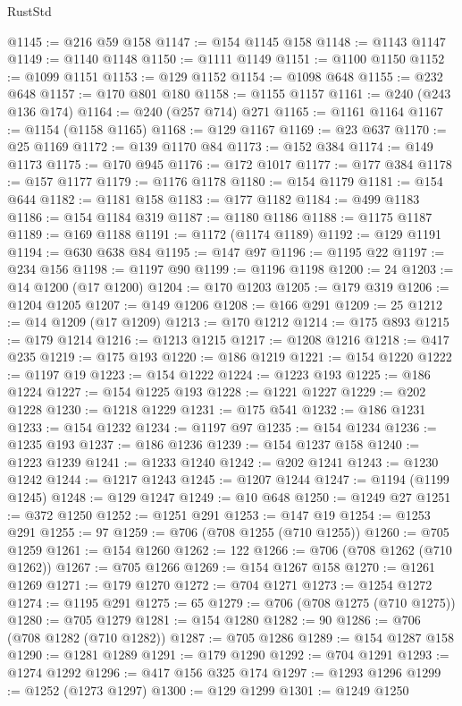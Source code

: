 \begin{lexlean}{RustStd}
\begin{coremodule}
{\begin{coremodule}
{{{{{{{{{{{{{{{{{{{{{{{{{{{{{{{{{{{{{{{@1145 := @216 @59 @158
@1147 := @154 @1145 @158
@1148 := @1143 @1147
@1149 := @1140 @1148
@1150 := @1111 @1149
@1151 := @1100 @1150
@1152 := @1099 @1151
@1153 := @129 @1152
@1154 := @1098 @648
@1155 := @232 @648
@1157 := @170 @801 @180
@1158 := @1155 @1157
@1161 := @240 (@243 @136 @174)
@1164 := @240 (@257 @714) @271
@1165 := @1161 @1164
@1167 := @1154 (@1158 @1165)
@1168 := @129 @1167
@1169 := @23 @637
@1170 := @25 @1169
@1172 := @139 @1170 @84
@1173 := @152 @384
@1174 := @149 @1173
@1175 := @170 @945
@1176 := @172 @1017
@1177 := @177 @384
@1178 := @157 @1177
@1179 := @1176 @1178
@1180 := @154 @1179
@1181 := @154 @644
@1182 := @1181 @158
@1183 := @177 @1182
@1184 := @499 @1183
@1186 := @154 @1184 @319
@1187 := @1180 @1186
@1188 := @1175 @1187
@1189 := @169 @1188
@1191 := @1172 (@1174 @1189)
@1192 := @129 @1191
@1194 := @630 @638 @84
@1195 := @147 @97
@1196 := @1195 @22
@1197 := @234 @156
@1198 := @1197 @90
@1199 := @1196 @1198
@1200 := 24
@1203 := @14 @1200 (@17 @1200)
@1204 := @170 @1203
@1205 := @179 @319
@1206 := @1204 @1205
@1207 := @149 @1206
@1208 := @166 @291
@1209 := 25
@1212 := @14 @1209 (@17 @1209)
@1213 := @170 @1212
@1214 := @175 @893
@1215 := @179 @1214
@1216 := @1213 @1215
@1217 := @1208 @1216
@1218 := @417 @235
@1219 := @175 @193
@1220 := @186 @1219
@1221 := @154 @1220
@1222 := @1197 @19
@1223 := @154 @1222
@1224 := @1223 @193
@1225 := @186 @1224
@1227 := @154 @1225 @193
@1228 := @1221 @1227
@1229 := @202 @1228
@1230 := @1218 @1229
@1231 := @175 @541
@1232 := @186 @1231
@1233 := @154 @1232
@1234 := @1197 @97
@1235 := @154 @1234
@1236 := @1235 @193
@1237 := @186 @1236
@1239 := @154 @1237 @158
@1240 := @1223 @1239
@1241 := @1233 @1240
@1242 := @202 @1241
@1243 := @1230 @1242
@1244 := @1217 @1243
@1245 := @1207 @1244
@1247 := @1194 (@1199 @1245)
@1248 := @129 @1247
@1249 := @10 @648
@1250 := @1249 @27
@1251 := @372 @1250
@1252 := @1251 @291
@1253 := @147 @19
@1254 := @1253 @291
@1255 := 97
@1259 := @706 (@708 @1255 (@710 @1255))
@1260 := @705 @1259
@1261 := @154 @1260
@1262 := 122
@1266 := @706 (@708 @1262 (@710 @1262))
@1267 := @705 @1266
@1269 := @154 @1267 @158
@1270 := @1261 @1269
@1271 := @179 @1270
@1272 := @704 @1271
@1273 := @1254 @1272
@1274 := @1195 @291
@1275 := 65
@1279 := @706 (@708 @1275 (@710 @1275))
@1280 := @705 @1279
@1281 := @154 @1280
@1282 := 90
@1286 := @706 (@708 @1282 (@710 @1282))
@1287 := @705 @1286
@1289 := @154 @1287 @158
@1290 := @1281 @1289
@1291 := @179 @1290
@1292 := @704 @1291
@1293 := @1274 @1292
@1296 := @417 @156 @325 @174
@1297 := @1293 @1296
@1299 := @1252 (@1273 @1297)
@1300 := @129 @1299
@1301 := @1249 @1250
}}}}}}}}}}}}}}}}}}}}}}}}}}}}}}}}}}}}}}}
\end{coremodule}}
\end{coremodule}
\end{lexlean}
